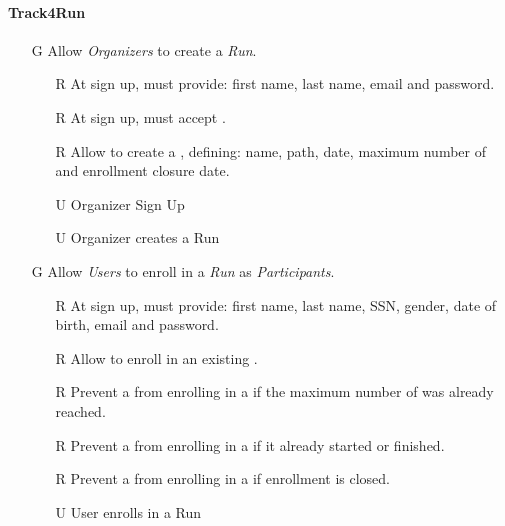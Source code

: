 \documentclass[../../../rasd.tex]{subfiles}
\begin{document}
\paragraph{Track4Run}
\begin{itemize}
	\item[G\subs{8}]Allow \textit{Organizers} to create a \textit{Run}.
	\begin{itemize}
		\item[R\subs{41}]At sign up,  must provide: first name, last name, email and password.
		\item[R\subs{42}]At sign up,  must accept .
		\item[R\subs{43}]Allow  to create a , defining: name, path, date, maximum number of  and enrollment closure date. 
		\\
		\item[U\subs{13}]Organizer Sign Up  
		\item[U\subs{14}]Organizer creates a Run
	\end{itemize}

	\item[G\subs{9}]Allow \textit{Users} to enroll in a \textit{Run} as \textit{Participants}. 
	\begin{itemize}
		\item[R\subs{2}]At sign up,  must provide: first name, last name, SSN, gender, date of birth, email and password.
		\item[R\subs{44}]Allow  to enroll in an existing .
		\item[R\subs{45}]Prevent a  from enrolling in a  if the maximum number of  was already reached.
		\item[R\subs{46}]Prevent a  from enrolling in a  if it already started or finished.
		\item[R\subs{47}]Prevent a  from enrolling in a  if enrollment is closed.
		\\
		\item[U\subs{15}]User enrolls in a Run
	\end{itemize}


\end{itemize}
\end{document}
